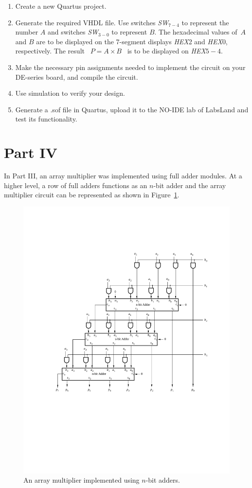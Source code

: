 \documentclass[epsfig,10pt,fullpage]{article}
\begin{document}
\begin{enumerate}
\item Create a new Quartus project.
\item Generate the required VHDL file. Use switches {\it SW}$_{7-4}$ to represent the 
number $A$ and switches {\it SW}$_{3-0}$ to represent $B$. The hexadecimal values of~$A$ 
and $B$ are to be displayed on the 7-segment displays {\it HEX}2 and {\it HEX}0, respectively.
The result ~$P = A \times B$~ is to be displayed on {\it HEX}$5-4$.
\item Make the necessary pin assignments needed to implement the circuit on your
DE-series board, and compile the circuit.
\item Use simulation to verify your design.
\item Generate a .sof file in Quartus, upload it to the NO-IDE lab of LabsLand and test its functionality.
\end{enumerate}

\section*{Part IV}
In Part III, an array multiplier was implemented using full adder modules. At a higher level, a row of full adders functions as an $n$-bit adder and the array multiplier circuit can be represented as shown in Figure~\ref{fig:array_mult_adders}.

\begin{figure}[H]
\centerline{
\includegraphics{figures/array_mult_adders}}
\caption{An array multiplier implemented using $n$-bit adders.}
\label{fig:array_mult_adders}
\end{figure}
\end{document}
